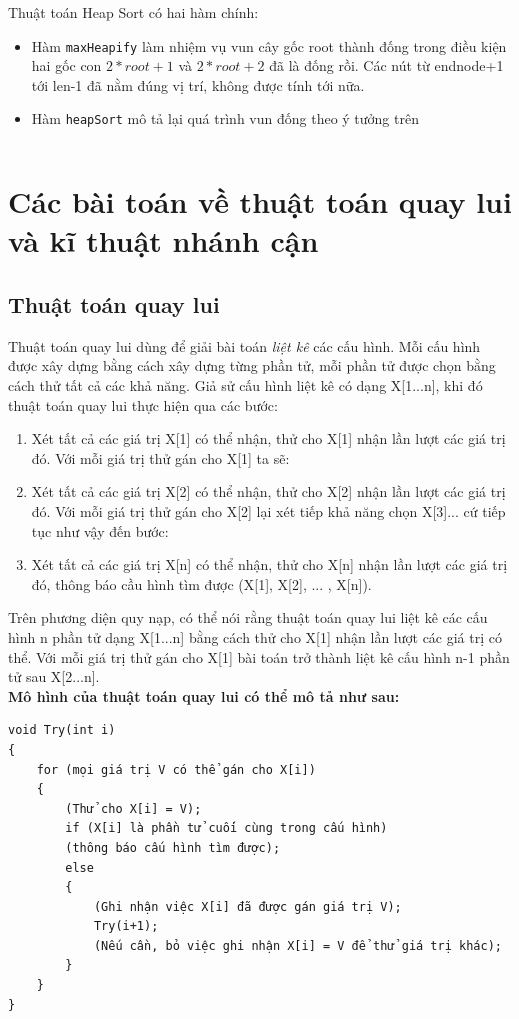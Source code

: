 \documentclass[8pt, a4paper]{article}
\newcommand{\mnt}[1]{\inputminted[frame=single, linenos=true, tabsize=4]{c++}{#1}}
\begin{document}
Thuật toán Heap Sort có hai hàm chính:

\begin{itemize}
\item Hàm \texttt{maxHeapify} làm nhiệm vụ vun cây gốc root thành đống trong điều kiện hai gốc con $2*root+1$ và $2*root+2$ đã là đống rồi. Các nút từ endnode+1 tới len-1 đã nằm đúng vị trí, không được tính tới nữa.
\item Hàm \texttt{heapSort} mô tả lại quá trình vun đống theo ý tưởng trên
\end{itemize}

\mnt{src/heapsort.cpp}



\section{Các bài toán về thuật toán quay lui và kĩ thuật nhánh cận}
\subsection{Thuật toán quay lui}
Thuật toán quay lui dùng để giải bài toán \emph{liệt kê} các cấu hình. Mỗi cấu hình được xây dựng bằng cách xây dựng từng phần tử, mỗi phần tử được chọn bằng cách thử tất cả các khả năng. Giả sử cấu hình liệt kê có dạng X[1...n], khi đó thuật toán quay lui thực hiện qua các bước:
\begin{enumerate}
\item Xét tất cả các giá trị X[1] có thể nhận, thử cho X[1] nhận lần lượt các giá trị đó. Với mỗi giá trị thử gán cho X[1] ta sẽ:
\item Xét tất cả các giá trị X[2] có thể nhận, thử cho X[2] nhận lần lượt các giá trị đó. Với mỗi giá trị thử gán cho X[2] lại xét tiếp khả năng chọn X[3]... cứ tiếp tục như vậy đến bước:
\item Xét tất cả các giá trị X[n] có thể nhận, thử cho X[n] nhận lần lượt các giá trị đó, thông báo cầu hình tìm được (X[1], X[2], ... , X[n]).
\end{enumerate}

Trên phương diện quy nạp, có thể nói rằng thuật toán quay lui liệt kê các cấu hình n phần tử dạng X[1...n] bằng cách thử cho X[1] nhận lần lượt các giá trị có thể. Với mỗi giá trị thử gán cho X[1] bài toán trở thành liệt kê cấu hình n-1 phần tử sau X[2...n].\\

\textbf{Mô hình của thuật toán quay lui có thể mô tả như sau:}

\begin{verbatim}
void Try(int i)
{
    for (mọi giá trị V có thể gán cho X[i])
    {
        (Thử cho X[i] = V);
        if (X[i] là phần tử cuối cùng trong cấu hình)
        (thông báo cấu hình tìm được);
        else
        {
            (Ghi nhận việc X[i] đã được gán giá trị V);
            Try(i+1);
            (Nếu cần, bỏ việc ghi nhận X[i] = V để thử giá trị khác);
        }
    }
}
\end{verbatim}
\end{document}
